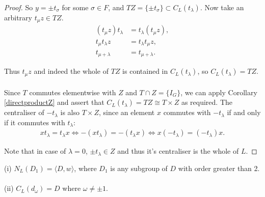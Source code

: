 \begin{proof}
So $y = \pm t_\sigma$ for some $\sigma \in F$, and $TZ = \{ \pm t_\sigma \} \subset C_L(t_\lambda)$. Now take an arbitrary $t_\mu z \in TZ$.
\begin{align*} (t_\mu z) t_\lambda &= t_\lambda (t_\mu z),
\\ t_\mu t_\lambda z &= t_\lambda t_\mu z, \tag{since $z \in Z$}
\\ t_{\mu + \lambda} &= t_{\mu + \lambda}.
\end{align*}

Thus $t_\mu z$ and indeed the whole of $TZ$ is contained in $ C_L(t_\lambda)$, so $C_L(t_\lambda) = TZ$. \\
\\
Since $T$ commutes elementwise with $Z$ and $T \cap Z = \{ I_G \}$, we can apply Corollary \ref{directproductZ} and assert that $C_L(t_\lambda) = TZ \cong T \times Z$ as required. The centraliser of $\minus t_\lambda$ is also $T \times Z$, since an element $x$ commutes with $\minus t_\lambda$ if and only if it commutes with $t_\lambda$:
\begin{align*} xt_\lambda = t_\lambda x \iff   \minus(x t_\lambda) = \minus (t_\lambda x) \iff x(\minus t_\lambda) = (\minus t_\lambda)x.
\end{align*}

Note that in case of $\lambda = 0$, $\pm t_\lambda \in Z$ and thus it's centraliser is the whole of $L$.

\end{proof}

\begin{proposition}\label{6.4ii}
(i) $N_L(D_1) = \langle D , w \rangle$, where  $D_1$ is any subgroup of $D$ with order greater than 2. \\
\\
(ii) $C_L(d_\omega)= D$ where $\omega \neq \pm 1$.
\end{proposition}

